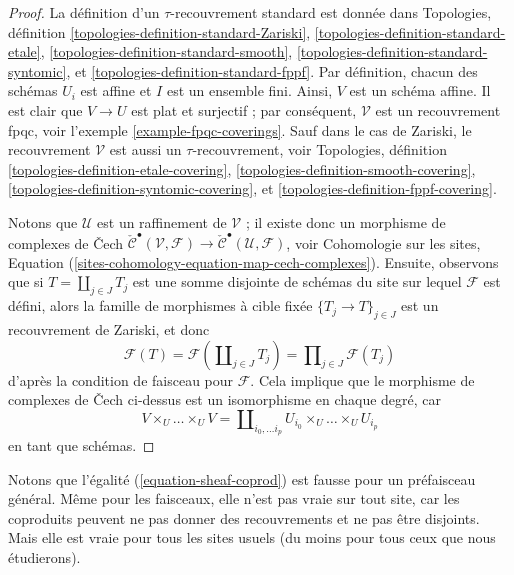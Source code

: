 \begin{proof}
La d\'efinition d'un $\tau$-recouvrement standard est donn\'ee dans
Topologies, définition
\ref{topologies-definition-standard-Zariski},
\ref{topologies-definition-standard-etale},
\ref{topologies-definition-standard-smooth},
\ref{topologies-definition-standard-syntomic}, et
\ref{topologies-definition-standard-fppf}.
Par d\'efinition, chacun des sch\'emas
$U_i$ est affine et $I$ est un ensemble fini. Ainsi, $V$ est un sch\'ema affine.
Il est clair que $V \to U$ est plat et surjectif ; par cons\'equent,
$\mathcal{V}$ est un recouvrement fpqc, voir
l'exemple \ref{example-fpqc-coverings}.
Sauf dans le cas de Zariski, le recouvrement $\mathcal{V}$
est aussi un $\tau$-recouvrement, voir
Topologies, définition
\ref{topologies-definition-etale-covering},
\ref{topologies-definition-smooth-covering},
\ref{topologies-definition-syntomic-covering}, et
\ref{topologies-definition-fppf-covering}.

\medskip\noindent
Notons que $\mathcal{U}$ est un raffinement de $\mathcal{V}$ ;
il existe donc un morphisme de complexes de {\v C}ech
$\check{\mathcal{C}}^\bullet (\mathcal{V}, \mathcal{F}) \to
\check{\mathcal{C}}^\bullet (\mathcal{U}, \mathcal{F})$, voir
Cohomologie sur les sites,
Equation (\ref{sites-cohomology-equation-map-cech-complexes}).
Ensuite, observons que si $T = \coprod_{j \in J} T_j$ est une
somme disjointe de sch\'emas du site sur lequel $\mathcal{F}$ est d\'efini,
alors la famille de morphismes \`a cible fix\'ee
$\{T_j \to T\}_{j \in J}$ est un recouvrement de Zariski, et donc
\begin{equation}
\label{equation-sheaf-coprod}
\mathcal{F}(T) =
\mathcal{F}(\coprod\nolimits_{j \in J} T_j) =
\prod\nolimits_{j \in J} \mathcal{F}(T_j)
\end{equation}
d'apr\`es la condition de faisceau pour $\mathcal{F}$.
Cela implique que le morphisme de complexes de {\v C}ech ci-dessus est un isomorphisme
en chaque degr\'e, car
$$
V \times_U \ldots \times_U V
=
\coprod\nolimits_{i_0, \ldots i_p} U_{i_0} \times_U \ldots \times_U U_{i_p}
$$
en tant que sch\'emas.
\end{proof}

\noindent
Notons que l'\'egalit\'e (\ref{equation-sheaf-coprod})
est fausse pour un pr\'efaisceau g\'en\'eral. M\^eme pour les faisceaux, elle n'est pas vraie sur tout
site, car les coproduits peuvent ne pas donner des recouvrements et ne pas \^etre disjoints.
Mais elle est vraie pour tous les sites usuels (du moins pour tous ceux que nous \'etudierons).

